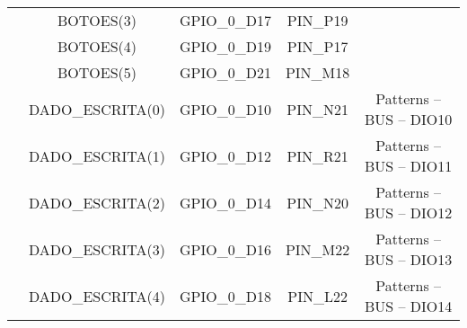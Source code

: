 \documentclass[amsmath,amssymb,floatfix]{report}
\begin{document}
\begin{table}[H]
\begin{tabular}{c|c|c|c|c|}
\multicolumn{1}{|c|}{}                           & BOTOES(3)               & GPIO\_0\_D17         & PIN\_P19                                                                                                                                                                              & \multicolumn{1}{l|}{}          \\ \cline{2-5} 
\multicolumn{1}{|c|}{}                           & BOTOES(4)               & GPIO\_0\_D19         & PIN\_P17                                                                                                                                                                              &                                \\ \cline{2-5} 
\multicolumn{1}{|c|}{}                           & BOTOES(5)               & GPIO\_0\_D21         & PIN\_M18                                                                                                                                                                              &                                \\ \cline{2-5} 
\multicolumn{1}{|c|}{}                           & DADO\_ESCRITA(0)        & GPIO\_0\_D10         & PIN\_N21                                                                                                                                                                              &  Patterns – BUS – DIO10 \\ \cline{2-5} 
\multicolumn{1}{|c|}{}                           & DADO\_ESCRITA(1)        & GPIO\_0\_D12         & PIN\_R21                                                                                                                                                                              &  Patterns – BUS – DIO11 \\ \cline{2-5} 
\multicolumn{1}{|c|}{}                           & DADO\_ESCRITA(2)        & GPIO\_0\_D14         & PIN\_N20                                                                                                                                                                              &  Patterns – BUS – DIO12    \\ \cline{2-5} 
\multicolumn{1}{|c|}{}                           & DADO\_ESCRITA(3)        & GPIO\_0\_D16         & PIN\_M22                                                                                                                                                                              &  Patterns – BUS – DIO13 \\ \cline{2-5} 
\multicolumn{1}{|c|}{}                           & DADO\_ESCRITA(4)        & GPIO\_0\_D18         & PIN\_L22                                                                                                                                                                              &  Patterns – BUS – DIO14 \\ \cline{2-5} 

\end{tabular}
\end{table}
\end{document}
